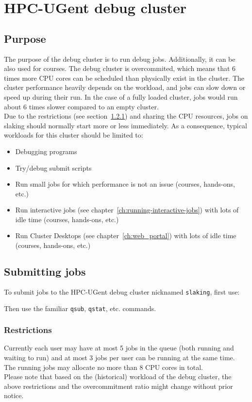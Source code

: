 \chapter{HPC-UGent debug cluster}
\label{ch:debug_ugent}


\section{Purpose}
\label{sec:debug_ugent_pupose}
The purpose of the debug cluster is to run debug jobs. Additionally, it can be also used for courses. 
The debug cluster is overcommited, which means that 6 times more CPU cores can be
scheduled than physically exist in the cluster. The cluster performance heavily depends on the
workload, and jobs can slow down or speed up during their run. In the case of a
fully loaded cluster, jobs would run about 6 times slower compared to an empty cluster. 
\\ Due to the restrictions (see section~\ref{subsec:debug_ugent_restrictions}) and sharing the CPU
resources, jobs on slaking should normally start more or less immediately. As a consequence,
typical workloads for this cluster should be limited to:
\begin{itemize}
  \item  Debugging programs
  \item  Try/debug submit scripts
  \item  Run small jobs for which performance is not an issue (courses, hands-ons, etc.)
  \item  Run interactive jobs (see chapter~\ref{ch:running-interactive-jobs}) with lots of idle time
         (courses, hands-ons, etc.) 
  \item  Run Cluster Desktops (see chapter~\ref{ch:web_portal}) with lots of idle time
         (courses, hands-ons, etc.)
\end{itemize} 

\section{Submitting jobs}
\label{sec:debug_ugent_jobs}

To submit jobs to the HPC-UGent debug cluster nicknamed \lstinline|slaking|, first use:

\begin{prompt}
\end{prompt}

Then use the familiar \lstinline|qsub|, \lstinline|qstat|, etc. commands.

\subsection{Restrictions}
\label{subsec:debug_ugent_restrictions}

Currently each user may have at most 5 jobs in the queue (both running and waiting to run)
and at most 3 jobs per user can be running at the same time. The running jobs may allocate 
no more than 8 CPU cores in total. \\ Please note that based on the (historical) workload
of the debug cluster, the above restrictions and the overcommitment ratio might change
without prior notice.
